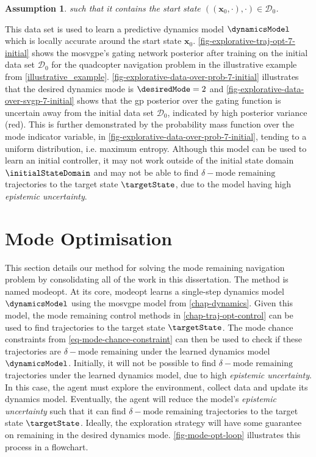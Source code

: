 \documentclass{mimosis-class/mimosis}
\newtheorem{assumption}{Assumption}[section]
\numberwithin{equation}{chapter}
\newcommand{\state}{\ensuremath{\mathbf{x}}}
\newcommand{\dataset}{\ensuremath{\mathcal{D}}}
\begin{document}
{\begin{assumption}
such that it contains the start state $((\state_0, \cdot), \cdot) \in \dataset_0$.
\end{assumption}
This data set is used to learn a predictive dynamics model \(\dynamicsModel\)
which is locally accurate around the start state \(\state_0\).
\cref{fig-explorative-traj-opt-7-initial} shows the \acrshort{mosvgpe}'s gating network posterior after training on the
initial data set \(\dataset_0\) for the quadcopter navigation problem in the illustrative example from
\cref{illustrative_example}.
\cref{fig-explorative-data-over-prob-7-initial} illustrates that the desired dynamics mode is \(\desiredMode=2\)
and \cref{fig-explorative-data-over-svgp-7-initial} shows that the \acrshort{gp} posterior over the gating function
is uncertain away from the initial data set \(\dataset_0\), indicated by high posterior variance (red).
This is further demonstrated by the probability mass function over the mode indicator variable,
in \cref{fig-explorative-data-over-prob-7-initial},
tending to a uniform distribution, i.e. maximum entropy.
Although this model can be used to learn an
initial controller, it may not work outside of the initial state domain \(\initialStateDomain\) and may
not be able to find \(\delta-\text{mode remaining}\) trajectories to the target state \(\targetState\), due to
the model having high \emph{epistemic uncertainty}.

\section{Mode Optimisation \label{sec-mode-optimisation}}
\label{sec:org2c1960c}
This section details our method for solving the mode remaining navigation problem by consolidating all of
the work in this dissertation. The method is named \acrfull{modeopt}.
At its core, \acrshort{modeopt} learns a single-step dynamics model \(\dynamicsModel\) using the \acrshort{mosvgpe}
model from \cref{chap-dynamics}.
Given this model, the mode remaining control methods in \cref{chap-traj-opt-control}
can be used to find trajectories to the target state \(\targetState\).
The mode chance constraints from \cref{eq-mode-chance-constraint}
can then be used to check if these trajectories are \(\delta-\text{mode remaining}\) under the learned dynamics
model \(\dynamicsModel\).
Initially, it will not be possible to find
\(\delta-\text{mode remaining}\) trajectories under the learned dynamics model, due to high
\emph{epistemic uncertainty}.
In this case, the agent must explore the environment, collect  data and update its dynamics model.
Eventually, the agent will reduce the model's \emph{epistemic uncertainty} such that
it can find \(\delta-\text{mode remaining}\) trajectories to the target state \(\targetState\).
Ideally, the exploration strategy will have some guarantee on remaining in the desired dynamics mode.
\cref{fig-mode-opt-loop} illustrates this process in a flowchart.

}
\end{document}
